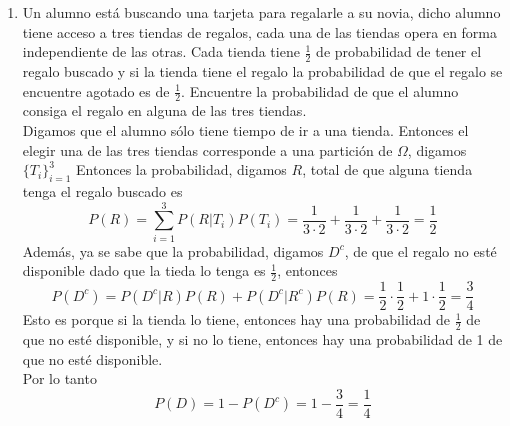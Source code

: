 \documentclass[12pt,a4paper]{report}
\begin{document}
\begin{enumerate}
  \item{
		Un alumno está buscando una tarjeta para regalarle a su novia,
		dicho alumno tiene acceso a tres tiendas de regalos, cada una de las tiendas
		opera en forma independiente de las otras. Cada tienda tiene $\frac{1}{2}$
		de probabilidad de tener el regalo buscado y si la tienda tiene el regalo la
		probabilidad de que el regalo se encuentre agotado es de $\frac{1}{2}$.
		Encuentre la probabilidad de que el alumno consiga el regalo en alguna de
		las tres tiendas.\\

		Digamos que el alumno sólo tiene tiempo de ir a una tienda. Entonces el elegir
		una de las tres tiendas corresponde a una partición de $\Omega$, digamos $\{T_i\}_{i = 1}^3$
		Entonces la probabilidad, digamos $R$, total de que alguna tienda tenga el regalo buscado es
		\begin{equation*}
			P(R) = \sum_{i = 1}^3 P(R | T_i) P(T_i) = \frac{1}{3 \cdot 2}
			+ \frac{1}{3 \cdot 2} + \frac{1}{3 \cdot 2} = \frac{1}{2}
		\end{equation*}
		Además, ya se sabe que la probabilidad, digamos $D^c$, de que el regalo no esté
		disponible dado que la tieda lo tenga es $\frac{1}{2}$, entonces
		\begin{equation*}
			P(D^c) = P(D^c | R)P(R) + P(D^c | R^c)P(R) = \frac{1}{2} \cdot \frac{1}{2}
			+ 1 \cdot \frac{1}{2} = \frac{3}{4}
		\end{equation*}
		Esto es porque si la tienda lo tiene, entonces hay una probabilidad de
		$\frac{1}{2}$ de que no esté disponible, y si no lo tiene, entonces hay una
		probabilidad de 1 de que no esté disponible. \\
		Por lo tanto
		\begin{equation*}
			P(D) = 1 - P(D^c) = 1 - \frac{3}{4} = \frac{1}{4}
		\end{equation*}
  }






\end{enumerate}
\end{document}
